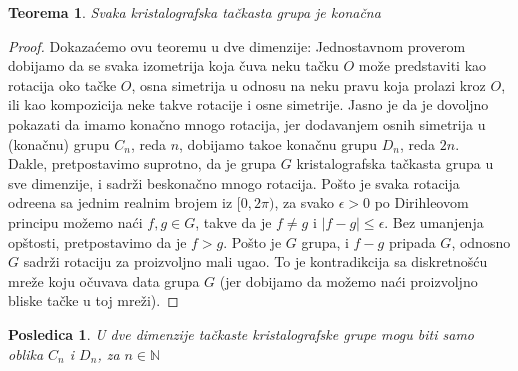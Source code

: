 \documentclass[times, utf8, diplomski]{fer}
\theoremstyle{plain}
\newtheorem{thm}{Teorema}
\newtheorem{cor}{Posledica}
\theoremstyle{definition}
\begin{document}
\begin{thm}
Svaka kristalografska ta\v ckasta grupa je kona\v cna
\end{thm}
\begin{proof}
Dokaza\'cemo ovu teoremu u dve dimenzije: Jednostavnom proverom dobijamo da se svaka izometrija koja \v cuva neku ta\v cku $O$ mo\v ze predstaviti kao rotacija oko ta\v cke $O$, osna simetrija u odnosu na neku pravu koja prolazi kroz $O$, ili kao kompozicija neke takve rotacije i osne simetrije. Jasno je da je dovoljno pokazati da imamo kona\v cno mnogo rotacija, jer dodavanjem osnih simetrija u (kona\v cnu) grupu $C_n$, reda $n$, dobijamo tako\dj e kona\v cnu grupu $D_n$, reda $2n$.\\
Dakle, pretpostavimo suprotno, da je grupa $G$ kristalografska ta\v ckasta grupa u sve dimenzije, i sadr\v zi beskona\v cno mnogo rotacija. Po\v sto je svaka rotacija odre\dj ena sa jednim realnim brojem iz $[0,2\pi)$, za svako $\epsilon>0$ po Dirihleovom principu mo\v zemo na\'ci $f, g\in G$, takve da je $f\neq g$ i $|f-g|\leq\epsilon$. Bez umanjenja op\v stosti, pretpostavimo da je $f>g$. Po\v sto je $G$ grupa, i $f-g$ pripada $G$, odnosno $G$ sadr\v zi rotaciju za proizvoljno mali ugao. To je kontradikcija sa diskretno\v s\'cu mre\v ze koju o\v cuvava data grupa $G$ (jer dobijamo da mo\v zemo na\'ci proizvoljno bliske ta\v cke u toj mre\v zi).
\end{proof}
\begin{cor}
U dve dimenzije ta\v ckaste kristalografske grupe mogu biti samo oblika $C_n$ i $D_n$, za $n\in\mathbb{N}$
\end{cor}
\end{document}
